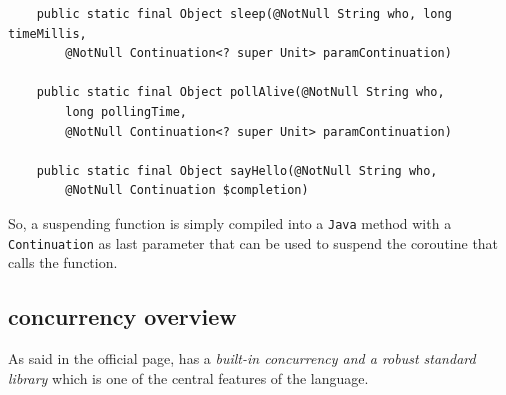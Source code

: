 \begin{lstlisting}
	public static final Object sleep(@NotNull String who, long timeMillis,
		@NotNull Continuation<? super Unit> paramContinuation)
		
	public static final Object pollAlive(@NotNull String who,
		long pollingTime,
		@NotNull Continuation<? super Unit> paramContinuation)
		
	public static final Object sayHello(@NotNull String who,
		@NotNull Continuation $completion)
\end{lstlisting}

So, a suspending function is simply compiled into a \texttt{Java} method with a \texttt{Continuation} as last parameter that can be used to suspend the coroutine that calls the function.

\subsection{\Go concurrency overview}

As said in the official page, \Go has a \textit{built-in concurrency and a robust standard library} which is one of the central features of the language.
